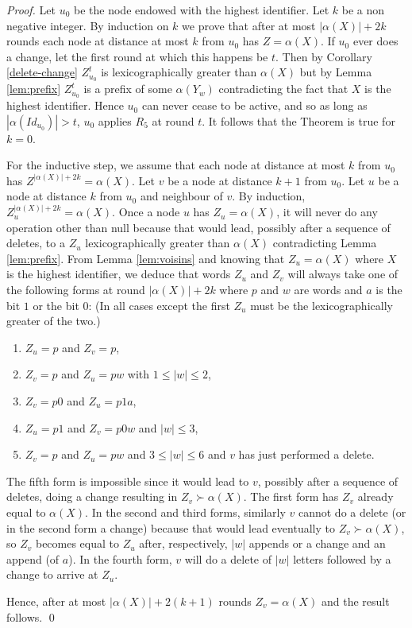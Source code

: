 \documentclass[11pt,envcountsame,letterpaper]{llncs}
\begin{document}
\begin{proof}
Let $u_0$ be the node endowed with the highest identifier. 
Let $k$ be a non negative integer.
By induction on $k$ we prove that after at most $|\alpha(X)|+2 k$ rounds
each node at distance at most $k$ from $u_0$
has $Z=\alpha(X)$.
If $u_0$ ever does a change, let the first round at which this happens be $t$.
Then by Corollary \ref{delete-change} $Z_{u_0}^t$ is lexicographically greater
than $\alpha(X)$ but by Lemma \ref{lem:prefix} $Z_{u_0}^t$ is a prefix of some
$\alpha(Y_w)$ contradicting the fact that $X$ is the highest identifier.
Hence
$u_0$ can never cease to be active,
and so
as long as $|\alpha(Id_{u_0})|>t$,
$u_0$ applies $R_5$ at round $t$.
It follows that the Theorem is true for $k=0$.

For the inductive step,
we assume that each node at distance at most $k$ from $u_0$
has $Z^{|\alpha(X)|+2 k}=\alpha(X)$.
Let $v$ be a node at distance $k+1$ from $u_0$. Let $u$ be a node
at distance $k$ from $u_0$ and neighbour of $v$.
By induction, $Z_u^{|\alpha(X)|+2 k}=\alpha(X)$.
Once a node $u$ has $Z_u=\alpha(X)$, it will never do any operation other than null
because that would lead, possibly after a sequence of deletes, to a $Z_u$
lexicographically greater than $\alpha(X)$ contradicting Lemma \ref{lem:prefix}.
From Lemma \ref{lem:voisins} and knowing
that  $Z_u=\alpha(X)$ where $X$ is the highest identifier,
we deduce that  words $Z_u$ and $Z_v$
will always take one of the following forms 
at round $|\alpha(X)|+2 k$ where $p$ and
$w$ are words and $a$ is the bit $1$ or the bit $0$:
(In all cases except the first $Z_u$ must be the lexicographically greater of the two.)
\begin{enumerate}
\item $Z_u=p$ and $Z_v=p$,
\item  $Z_v=p$ and $Z_u=pw$ with $1\leq |w|\leq 2$,
\item $Z_v=p0$  and $Z_u=p1a$,
\item  $Z_u=p1$ and $Z_v=p0w$ and $|w|\leq 3$,
\item $Z_v=p$ and $Z_u=pw$ and $3\leq |w| \leq 6$ and $v$ has just performed
a delete.
\end{enumerate}
The fifth form is impossible since it would lead to $v$, possibly after a sequence
of deletes, doing a change resulting in $Z_v\succ \alpha(X)$.
The first form has $Z_v$ already equal to $\alpha(X)$.
In the second and third forms, similarly $v$ cannot do a delete (or in the second form
a change) because that would lead
eventually to $Z_v\succ \alpha(X)$, so $Z_v$ becomes equal to $Z_u$ after,
respectively, $|w|$ appends or a change and an append (of $a$).
In the fourth form, $v$ will do a delete of $|w|$ letters followed by a change to arrive at
$Z_u$.

Hence, after at most $|\alpha(X)|+2 (k+1)$ rounds $Z_v=\alpha(X)$ and the
result follows.
\qed
\end{proof}
\end{document}

